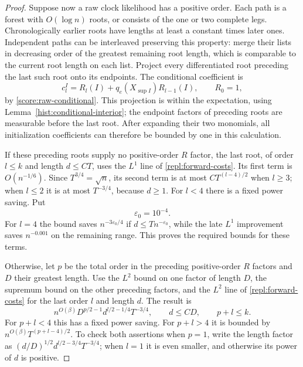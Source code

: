 \begin{proof}
Suppose now a raw clock likelihood has a positive order.  Each path is a
forest with $O(\log n)$ roots, or consists of the one or two complete legs.
Chronologically earlier roots have lengths at least a constant times later
ones.  Independent paths can be interleaved preserving this property:
merge their lists in decreasing order of the greatest remaining root length,
which is comparable to the current root length on each list.
Project every differentiated root preceding the last such root onto its
endpoints.  The conditional coefficient is
\[
 c_l^I=R_l(I)+q_e(X_{\sup I})R_{l-1}(I),
 \qquad R_0=1,
\]
by \eqref{score:raw-conditional}.  This projection is within the expectation,
using Lemma~\ref{hist:conditional-interior}; the endpoint factors of preceding
roots are measurable before the last root.  After expanding their two
monomials, all initialization coefficients can therefore be bounded by one
in this calculation.

If these preceding roots supply no positive-order $R$ factor, the last
root, of order $l\le k$ and length $d\le CT$, uses the $L^1$ line of
\eqref{repl:forward-costs}.  Its first term is $O(n^{-1/6})$.
Since $T^{3/4}=\sqrt n$, its second term is at most
$CT^{(l-4)/2}$ when $l\ge3$; when $l\le2$ it is at most $T^{-3/4}$,
because $d\ge1$.  For $l<4$ there is a fixed power saving.  Put
\[
 \varepsilon_0=10^{-4}.
\]
For $l=4$ the bound saves $n^{-3\varepsilon_0/4}$ if
$d\le Tn^{-\varepsilon_0}$, while the late $L^1$ improvement saves
$n^{-0.001}$ on the remaining range.  This proves the required bounds for
these terms.

Otherwise, let $p$ be the total order in the preceding positive-order $R$
factors and $D$ their greatest length.  Use the $L^2$ bound on one factor
of length $D$, the supremum bound on the other preceding factors, and the
$L^2$ line of \eqref{repl:forward-costs} for the last order $l$ and length
$d$.  The result is
\begin{equation}\label{repl:unmarked-product}
 n^{O(\beta)}D^{p/2-1}d^{l/2-1/4}T^{-3/4},
 \qquad d\le C D,\qquad p+l\le k.
\end{equation}
For $p+l<4$ this has a fixed power saving.  For $p+l>4$ it is bounded by
$n^{O(\beta)}T^{(p+l-4)/2}$.  To check both assertions when $p=1$, write
the length factor as $(d/D)^{1/2}d^{l/2-3/4}T^{-3/4}$; when $l=1$ it is
even smaller, and otherwise its power of $d$ is positive.


\end{proof}
